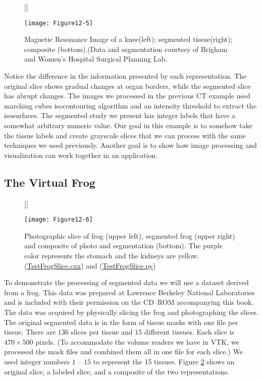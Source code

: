 \begin{figure}[!htb]
	[\FBwidth]
	{\caption{Magnetic Resonance Image of a knee(left); segmented tissue(right); composite (bottom).(Data and segmentation courtesy of Brigham and Women's Hospital Surgical Planning Lab.}\label{fig:Figure12-5}}
	{\texttt{[image: Figure12-5]}}
\end{figure}

Notice the difference in the information presented by each representation. The original slice shows gradual changes at organ borders, while the segmented slice has abrupt changes. The images we processed in the previous CT example used marching cubes isocontouring algorithm and an intensity threshold to extract the isosurfaces. The segmented study we present has integer labels that have a somewhat arbitrary numeric value. Our goal in this example is to somehow take the tissue labels and create grayscale slices that we can process with the same techniques we used previously. Another goal is to show how image processing and visualization can work together in an application.

\subsection{The Virtual Frog}

\begin{figure}[!htb]
	[\FBwidth]
	{\caption{Photographic slice of frog (upper left), segmented frog (upper right) and composite of photo and segmentation (bottom). The purple color represents the stomach and the kidneys are yellow.(\href{https://lorensen.github.io/VTKExamples/site/Cxx/Visualization/TestFrogSlice/}{TestFrogSlice.cxx}) and (\href{https://lorensen.github.io/VTKExamples/site/Python/Visualization/TestFrogSlice/}{TestFrogSlice.py})}\label{fig:Figure12-6}}
	{\texttt{[image: Figure12-6]}}
\end{figure}

To demonstrate the processing of segmented data we will use a dataset derived from a frog. This data was prepared at Lawrence Berkeley National Laboratories and is included with their permission on the CD--ROM accompanying this book. The data was acquired by physically slicing the frog and photographing the slices. The original segmented data is in the form of tissue masks with one file per tissue. There are $136$ slices per tissue and $15$ different tissues. Each slice is $470 \times 500$ pixels. (To accommodate the volume readers we have in VTK, we processed the mask files and combined them all in one file for each slice.) We used integer numbers $1$ -- $15$ to represent the 15 tissues. Figure \ref{fig:Figure12-6} shows an original slice, a labeled slice, and a composite of the two representations.

